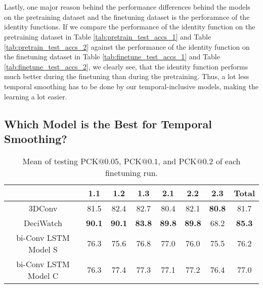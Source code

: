 \documentclass[./main.tex]{subfiles}
\begin{document}
\\
\\
Lastly, one major reason behind the performance differences behind the models on the pretraining dataset and the finetuning dataset is the perforamnce of the identity functions. If we compare the performance of the identity function on the pretraining dataset in Table \ref{tab:pretrain_test_accs_1} and Table \ref{tab:pretrain_test_accs_2} against the performance of the identity function on the finetuning dataset in Table \ref{tab:finetune_test_accs_1} and Table \ref{tab:finetune_test_accs_2}, we clearly see, that the identity function performs much better during the finetuning than during the pretraining. Thus, a lot less temporal smoothing has to be done by our temporal-inclusive models, making the learning a lot easier.

\subsection{Which Model is the Best for Temporal Smoothing?}
\label{sec:best_model}
\begin{table}[htbp]
    \centering
    \begin{tabular}{c||cccccc|c}
        \hline
        & 1.1 & 1.2 & 1.3 & 2.1 & 2.2 & 2.3 & Total \\
        \hline
        \hline
        3DConv & 81.5 & 82.4 & 82.7 & 80.4 & 82.1 & \textbf{80.8} & 81.7 \\
        DeciWatch & \textbf{90.1} & \textbf{90.1} & \textbf{83.8} & \textbf{89.8} & \textbf{89.8} & 68.2 & \textbf{85.3} \\
        bi-Conv LSTM Model S & 76.3 & 75.6 & 76.8 & 77.0 & 76.0 & 75.5 & 76.2 \\
        bi-Conv LSTM Model C & 76.3 & 77.4 & 77.3 & 77.1 & 77.2 & 76.4 & 77.0 \\
        \hline
    \end{tabular}
    \caption{Mean of testing PCK$@0.05$, PCK$@0.1$, and PCK$@0.2$ of each finetuning run.}
    \label{tab:finetune_mean_res}
\end{table}\
\end{document}
